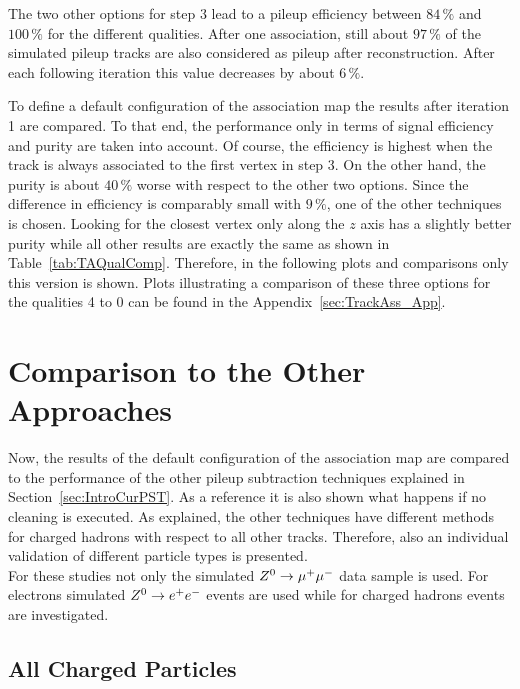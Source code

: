 The two other options for step 3 lead to a pileup efficiency between $84\,\%$ and $100\,\%$ for the different qualities. After one association, still about $97\,\%$ of the simulated pileup tracks are also considered as pileup after reconstruction. After each following iteration this value decreases by about $6\,\%$.

To define a default configuration of the association map the results after iteration 1 are compared. To that end, the performance only in terms of signal efficiency and purity are taken into account. Of course, the efficiency is highest when the track is always associated to the first vertex in step 3. On the other hand, the purity is about $40\,\%$ worse with respect to the other two options. Since the difference in efficiency is comparably small with $9\,\%$, one of the other techniques is chosen. Looking for the closest vertex only along the $z$ axis has a slightly better purity while all other results are exactly the same as shown in Table~\ref{tab:TAQualComp}.  Therefore, in the following plots and comparisons only this version is shown. Plots illustrating a comparison of these three options for the qualities 4 to 0 can be found in the Appendix~\ref{sec:TrackAss_App}.

\section{Comparison to the Other Approaches \label{sec:TASEFRDA}}

Now, the results of the default configuration of the association map are compared to the performance of the other pileup subtraction techniques explained in Section~\ref{sec:IntroCurPST}. As a reference it is also shown what happens if no cleaning is executed. As explained, the other techniques have different methods for charged hadrons with respect to all other tracks. Therefore, also an individual validation of different particle types is presented. \\
For these studies not only the simulated ${Z^{0}}\rightarrow\mu^+\mu^-$ data sample is used. For electrons simulated ${Z^{0}}\rightarrow e^+e^-$ events are used while for charged hadrons \ttbar events are investigated.

\subsection{All Charged Particles \label{sec:TASEFRDACP}}

